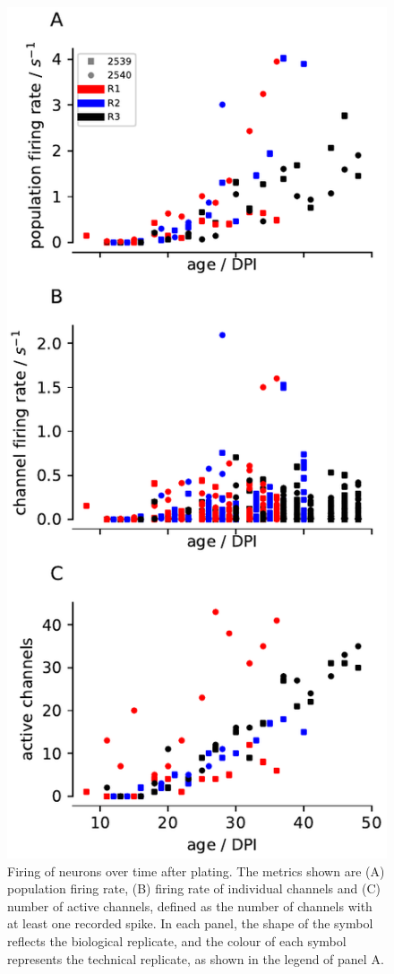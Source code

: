 \documentclass[doublespacing]{bmcart}
\begin{document}
\begin{backmatter}
\begin{figure}[h!]
    \includegraphics{../plots/development_plots.pdf}
	\caption{Firing of neurons over time after plating. The metrics shown are (A) population firing rate, (B) firing rate of individual channels and (C) number of active channels, defined as the number of channels with at least one recorded spike.  In each panel, the shape of the symbol reflects the biological replicate, and the colour of each symbol represents the technical replicate, as shown in the legend of panel A.}
	\label{fig:development}
\end{figure}



\end{backmatter}
\end{document}
